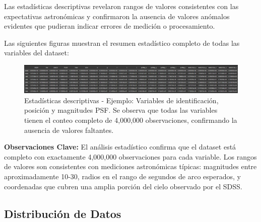 \documentclass{article}
\begin{document}
Las estadísticas descriptivas revelaron rangos de valores consistentes con las expectativas astronómicas y confirmaron la ausencia de valores anómalos evidentes que pudieran indicar errores de medición o procesamiento.

Las siguientes figuras muestran el resumen estadístico completo de todas las variables del dataset:

\begin{figure}[H]
    \centering
    \includegraphics[width=1.0\linewidth]{describe_1.png}
    \caption{Estadísticas descriptivas - Ejemplo: Variables de identificación, posición y magnitudes PSF. Se observa que todas las variables tienen el conteo completo de 4,000,000 observaciones, confirmando la ausencia de valores faltantes.}
    \label{fig:describe1}
\end{figure}



\textbf{Observaciones Clave:} El análisis estadístico confirma que el dataset está completo con exactamente 4,000,000 observaciones para cada variable. Los rangos de valores son consistentes con mediciones astronómicas típicas: magnitudes entre aproximadamente 10-30, radios en el rango de segundos de arco esperados, y coordenadas que cubren una amplia porción del cielo observado por el SDSS.

\subsection{Distribución de Datos}
\end{document}

